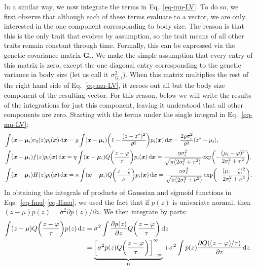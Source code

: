 \documentclass{article}
\newcommand{\mat}[1]{\bm{#1}}
\newcommand{\ud}{\text{d}}
\let\originalleft\left
\let\originalright\right
\renewcommand{\left}{\mathopen{}\mathclose\bgroup\originalleft}
\renewcommand{\right}{\aftergroup\egroup\originalright}
\begin{document}
In a similar way, we now integrate the terms in Eq.~\ref{eq-mu-LV}. To do so, we first observe that although each of these terms evaluate to a vector, we are only interested in the one component corresponding to body size. The reason is that this is the only trait that evolves by assumption, so the trait means of all other traits remain constant through time. Formally, this can be expressed via the genetic covariance matrix $\mat{G}_i$. We make the simple assumption that every entry of this matrix is zero, except the one diagonal entry corresponding to the genetic variance in body size (let us call it $\sigma_{G,i}^2$). When this matrix multiplies the rest of the right hand side of Eq.~\ref{eq-mu-LV}, it zeroes out all but the body size component of the resulting vector. For this reason, below we will write the results of the integrations for just this component, leaving it understood that all other components are zero. Starting with the terms under the single integral in Eq.~\ref{eq-mu-LV}:
\begin{align}
  \label{eq-r0mu}
  & \int (\mat{x} - \mat{\mu}_i) r_0(z) p_i(\mat{x}) \,\ud\mat{x}
  = \varrho \int (\mat{x} - \mat{\mu}_i)
  \left( 1 - \frac{(z-z^*)^2}{\theta^{2}} \right)
  p_i(\mat{x}) \,\ud\mat{x}
  = \frac{2\varrho\sigma_i^2}{\theta^2} \left(z^*-\mu_i\right),\\
  \label{eq-fmu}
  & \int (\mat{x} - \mat{\mu}_i) f(z) p_i(\mat{x}) \,\ud\mat{x}
  = \eta \int (\mat{x} - \mat{\mu}_i)
  Q\left( \frac{z-\varphi}{\tau} \right)
  p_i(\mat{x})\,\ud\mat{x}
  = \frac{\eta\sigma_i^2}{\sqrt{\pi(2\sigma_i^2+\tau^2)}}
  \exp\left(-\frac{(\mu_i-\varphi)^2}{2\sigma_i^2+\tau^2} \right),\\
  \label{eq-Hmu}
  & \int (\mat{x} - \mat{\mu}_i) H(z) p_i(\mat{x}) \,\ud\mat{x}
  = \kappa \int (\mat{x} - \mat{\mu}_i)
  Q\left( \frac{z-\zeta}{\nu} \right) p_i(\mat{x}) \,\ud\mat{x}
  = \frac{\kappa\sigma_i^2}{\sqrt{\pi(2\sigma_i^2+\nu^2)}}
  \exp\left( -\frac{(\mu_i-\zeta)^2}{2\sigma_i^2+\nu^2} \right) .
\end{align}
In obtaining the integrals of products of Gaussian and sigmoid functions in Eqs.~\ref{eq-fmu}-\ref{eq-Hmu}, we used the fact that if $p(z)$ is univariate normal, then $(z-\mu) p(z) = \sigma^2 \partial p(z) / \partial z$. We then integrate by parts:
\begin{equation}
  \label{eq-intbyparts}
  \begin{split}
  \int (z-\mu) Q\left(\frac{z-\varphi}{\tau}\right) p(z) \,\ud z
  &= \sigma^2 \int \frac{\partial p(z)}{\partial z}
  Q\left(\frac{z-\varphi}{\tau}\right) \,\ud z
  \\ &= \underbrace{\left[\sigma^2 p(z) Q\left(\frac{z-\varphi}
  {\tau}\right) \right]_{-\infty}^{\infty}}_{0}
  + \sigma^2 \int p(z)
  \frac{\partial Q((z-\varphi)/\tau)}{\partial z} \,\ud z .
  \end{split}
\end{equation}
\end{document}
